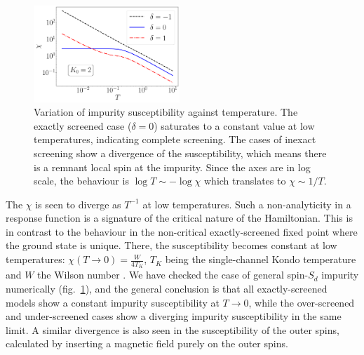 \documentclass[reprint,prb,superscriptaddress]{revtex4-2}
\begin{document}
\begin{figure}[!htpb]
\centering
\includegraphics[width=0.49\textwidth]{CentralFieldChiPowerlaw.pdf}
\caption{Variation of impurity susceptibility against temperature. The exactly screened case ($\delta=0$) saturates to a constant value at low temperatures, indicating complete screening. The cases of inexact screening show a divergence of the susceptibility, which means there is a remnant local spin at the impurity. Since the axes are in log scale, the behaviour is $\log T \sim -\log \chi$ which translates to $\chi \sim 1/T$.  }
\label{fig:suseptibility_impurity}
\end{figure}

The \(\chi\) is seen to diverge as \(T^{-1}\) at low temperatures. Such a non-analyticity in a response function is a signature of the critical nature of the Hamiltonian. This is in contrast to the behaviour in the non-critical exactly-screened fixed point where the ground state is unique. There, the susceptibility becomes constant at low temperatures: \(\chi(T\to 0) = \frac{W}{4 T_K}\), \(T_K\) being the single-channel Kondo temperature and \(W\) the Wilson number \cite{wilson1975renormalization,nozieres1974fermi,bullaNRGreview,kondo_urg}. We have checked the case of general spin-\(S_{d}\) impurity numerically (fig.~\ref{fig:suseptibility_impurity}), and the general conclusion is that all exactly-screened models show a constant impurity susceptibility at \(T \to 0\), while the over-screened and under-screened cases show a diverging impurity susceptibility in the same limit. A similar divergence is also seen in the susceptibility of the outer spins, calculated by inserting a magnetic field purely on the outer spins.
\end{document}
